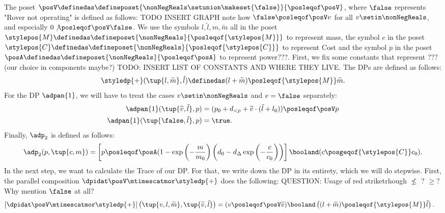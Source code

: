 {\begin{example}
    The poset $\posV \definedas \defineposet{\nonNegReals \setunion \makeset{\false}}{\posleqof\posV}$, where $\false$ represents "Rover not operating" is defined as follows: 
    TODO INSERT GRAPH
    note how $\false \posleqof\posV v$ for all $v \setin \nonNegReals$, and especially $0 \not\posleqof\posV \false$. 
    We use the symbols $l, \tilde{l}, m, \widetilde{m}$ all in the poset $\stylepos{M} \definedas \defineposet{\nonNegReals}{\posleqof{\stylepos{M}}}$ to represent mass, the symbol $c$ in the poset $\stylepos{C} \definedas \defineposet{\nonNegReals}{\posleqof{\stylepos{C}}}$ to represent Cost and the symbol $p$ in the poset $ \posA \definedas \defineposet{\nonNegReals}{\posleqof\posA}$ to represent power???. 
    First, we fix some constants that represent ???(our choice in components maybe?) TODO: INSERT LIST OF CONSTANTS AND WHERE THEY LIVE.
    The DPs are defined as follows:
    \begin{equation}
        \styledp{+}(\tup{l,\widetilde{m}}, \tilde{l}) \definedas  (l + \widetilde{m}) \posleqof{\stylepos{M}} \widetilde{m}
    .\end{equation}
    For the DP $\adpan{1}$, we will have to treat the cases $v \setin \nonNegReals$ and $v = \false$ separately:
    \begin{align}
        \adpan{1}(\tup{\widetilde{v}, \tilde{l}}, p) &= (p_0 + d_{< p}  + \widetilde{v}\cdot(\tilde{l} + l_0)) \posleqof\posV p\\
        \adpan{1}(\tup{\false, \tilde{l}}, p) &= \true
    .\end{align}
    Finally, $\adp_2$ is defined as follows:
    \begin{equation}
        \adp_2(p, \tup{c,m}) = \left[p \posleqof\posA (1-\exp\left(-\frac{m}{m_0}\right)\left(d_0 - d_\Delta \exp\left(- \frac{c}{c_0}\right)\right)\right]\booland (c\posgeqof{\stylepos{C}} c_0)
    .\end{equation}
    In the next step, we want to calculate the Trace of our DP. For that, we write down the DP in its entirety, which we will do stepwise. First, the parallel composition $\dpidat\posV \mtimescatmor \styledp{+}$ does the following:
    QUESTION: Usage of red striketrhough $\not\leq$ ? $\geq$? Why mention $\false$ at all?
    \begin{align}
        \left[\dpidat\posV\mtimescatmor \styledp{+}\right]\left(\tup{v, l, \widetilde{m}},\tup{\widetilde{v},\tilde{l}}\right) &= (v \posleqof\posV \widetilde{v})\booland\left((l + \widetilde{m})\posleqof{\stylepos{M}} \tilde{l}\right)
    .\end{align}

\end{example}}
